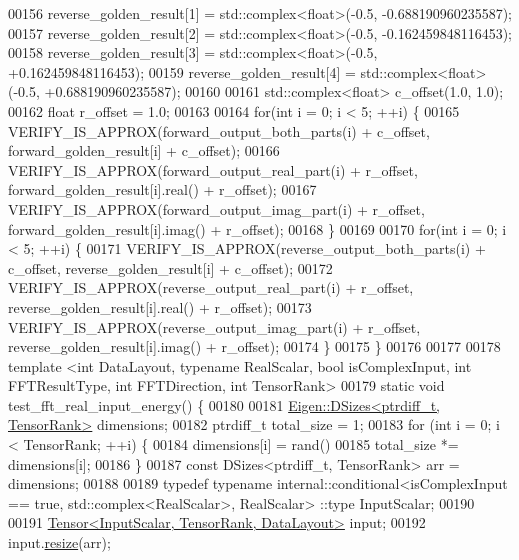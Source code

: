 \begin{DoxyCode}
00156   reverse\_golden\_result[1] = std::complex<float>(-0.5, -0.688190960235587);
00157   reverse\_golden\_result[2] = std::complex<float>(-0.5, -0.162459848116453);
00158   reverse\_golden\_result[3] = std::complex<float>(-0.5, +0.162459848116453);
00159   reverse\_golden\_result[4] = std::complex<float>(-0.5, +0.688190960235587);
00160 
00161   std::complex<float> c\_offset(1.0, 1.0);
00162   \textcolor{keywordtype}{float} r\_offset = 1.0;
00163 
00164   \textcolor{keywordflow}{for}(\textcolor{keywordtype}{int} i = 0; i < 5; ++i) \{
00165     VERIFY\_IS\_APPROX(forward\_output\_both\_parts(i) + c\_offset, forward\_golden\_result[i] + c\_offset);
00166     VERIFY\_IS\_APPROX(forward\_output\_real\_part(i)  + r\_offset, forward\_golden\_result[i].real() + r\_offset);
00167     VERIFY\_IS\_APPROX(forward\_output\_imag\_part(i)  + r\_offset, forward\_golden\_result[i].imag() + r\_offset);
00168   \}
00169 
00170   \textcolor{keywordflow}{for}(\textcolor{keywordtype}{int} i = 0; i < 5; ++i) \{
00171     VERIFY\_IS\_APPROX(reverse\_output\_both\_parts(i) + c\_offset, reverse\_golden\_result[i] + c\_offset);
00172     VERIFY\_IS\_APPROX(reverse\_output\_real\_part(i)  + r\_offset, reverse\_golden\_result[i].real() + r\_offset);
00173     VERIFY\_IS\_APPROX(reverse\_output\_imag\_part(i)  + r\_offset, reverse\_golden\_result[i].imag() + r\_offset);
00174   \}
00175 \}
00176 
00177 
00178 \textcolor{keyword}{template} <\textcolor{keywordtype}{int} DataLayout, \textcolor{keyword}{typename} RealScalar, \textcolor{keywordtype}{bool} isComplexInput, \textcolor{keywordtype}{int} FFTResultType, \textcolor{keywordtype}{int} FFTDirection, \textcolor{keywordtype}{
      int} TensorRank>
00179 \textcolor{keyword}{static} \textcolor{keywordtype}{void} test\_fft\_real\_input\_energy() \{
00180 
00181   \hyperlink{struct_eigen_1_1_d_sizes}{Eigen::DSizes<ptrdiff\_t, TensorRank>} dimensions;
00182   ptrdiff\_t total\_size = 1;
00183   \textcolor{keywordflow}{for} (\textcolor{keywordtype}{int} i = 0; i < TensorRank; ++i) \{
00184     dimensions[i] = rand() %
00185     total\_size *= dimensions[i];
00186   \}
00187   \textcolor{keyword}{const} DSizes<ptrdiff\_t, TensorRank> arr = dimensions;
00188 
00189   \textcolor{keyword}{typedef} \textcolor{keyword}{typename} internal::conditional<isComplexInput == true, std::complex<RealScalar>, RealScalar>
      ::type InputScalar;
00190 
00191   \hyperlink{class_eigen_1_1_tensor}{Tensor<InputScalar, TensorRank, DataLayout>} input;
00192   input.\hyperlink{class_eigen_1_1_tensor_a5ab1ec6dc9b05d5e4db3600bc9d2cc6b}{resize}(arr);

\end{DoxyCode}
